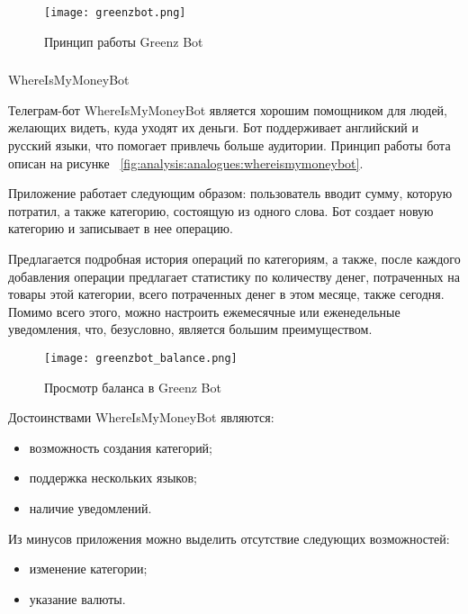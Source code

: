 \begin{figure}[!h]
	\centering
	\texttt{[image: greenzbot.png]} 
	\caption{Принцип работы Greenz Bot}
	\label{fig:analysis:analogues:greenz}
\end{figure}

\subsubsection{} WhereIsMyMoneyBot
\label{sec:analysis:analogues:whereismymoney}

Телеграм-бот WhereIsMyMoneyBot является хорошим помощником \linebreak для людей, желающих видеть, куда уходят их деньги. Бот поддерживает английский и русский языки, что помогает привлечь больше аудитории. Принцип работы бота описан на рисунке ~\ref{fig:analysis:analogues:whereismymoneybot}.

Приложение работает следующим образом: пользователь вводит сумму, которую потратил, а также категорию, состоящую из одного слова. Бот создает новую категорию и записывает в нее операцию.

Предлагается подробная история операций по категориям, а также, после каждого добавления операции предлагает статистику по количеству денег, потраченных на товары этой категории, всего потраченных денег в этом месяце, также сегодня. Помимо всего этого, можно настроить ежемесячные или еженедельные уведомления, что, безусловно, является большим преимуществом.

\begin{figure}[!h]
	\centering
	\texttt{[image: greenzbot\_balance.png]} 
	\caption{Просмотр баланса в Greenz Bot}
	\label{fig:analysis:analogues:greenz_balance}
\end{figure}

Достоинствами WhereIsMyMoneyBot являются:

\begin{itemize}
	\item возможность создания категорий;
	\item поддержка нескольких языков;
	\item наличие уведомлений.
\end{itemize}

Из минусов приложения можно выделить отсутствие следующих возможностей:

\begin{itemize}
	\item изменение категории;
	\item указание валюты.
\end{itemize}

